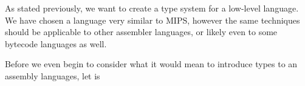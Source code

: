 As stated previously, we want to create a type system
for a low-level language. We have chosen a language very similar to MIPS,
however the same techniques should be applicable to other assembler languages,
or likely even to some bytecode languages as well.

Before we even begin to consider what it would mean to introduce types to an
assembly languages, let is
